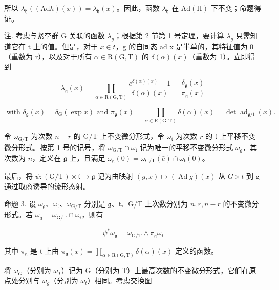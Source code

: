 所以 \(\lambda_{\mathfrak{h}}((\mathrm{Ad}h)(x)) = \lambda_{\mathfrak{h}}(x)\)。因此，函数 \(\lambda_{\mathfrak{h}}\) 在 \(\mathrm{Ad(H)}\) 下不变；命题得证。

注. 考虑与紧李群 G 关联的函数 \(\lambda_{g}\)；根据第 2 节第 1 号定理，要计算 \(\lambda_{g}\) 只需知道它在 t 上的值。但是，对于 \(x \in t\)，g 的自同态 ad x 是半单的，其特征值为 0（重数为 r），以及对于所有 \(\alpha \in \mathrm{R}(\mathrm{G}, \mathrm{T})\) 的 \(\delta(\alpha)(x)\)（重数为 1）。立即得到

\[
\lambda_ {\mathfrak {g}} (x) = \prod_ {\alpha \in \mathrm{R} (\mathrm{G}, \mathrm{T})} \frac {e ^ {\delta (\alpha) (x)} - 1}{\delta (\alpha) (x)} = \frac {\delta_ {\mathfrak {g}} (x)}{\pi_ {\mathfrak {g}} (x)}\tag{11}
\]

\[
\text { with } \delta_ {\mathfrak {g}} (x) = \delta_ {\mathrm{G}} (\exp x) \text { and } \pi_ {\mathfrak {g}} (x) = \prod_ {\alpha \in \mathrm{R} (\mathrm{G}, \mathrm{T})} \delta (\alpha) (x) = \det \operatorname{ad} _ {\mathfrak {g} / \mathfrak {t}} (x).
\]

令 \(\omega_{\mathrm{G / T}}\) 为次数 \(n - r\) 的 \(\mathrm{G / T}\) 上不变微分形式，令 \(\omega_{\mathfrak{t}}\) 为次数 \(r\) 的 \(\mathfrak{t}\) 上平移不变微分形式。按第 1 号的记号，将 \(\omega_{\mathrm{G / T}} \cap \omega_{\mathfrak{t}}\) 记为唯一的平移不变微分形式 \(\omega_{\mathfrak{g}}\)，其次数为 \(n\)，定义在 \(\mathfrak{g}\) 上，且满足 \(\omega_{\mathfrak{g}}(0) = \omega_{\mathrm{G / T}}(\bar{e}) \cap \omega_{\mathfrak{t}}(0)\)。

最后，将 \(\psi:(\mathrm{G}/\mathrm{T})\times\mathfrak{t}\to\mathfrak{g}\) 记为由映射 \((g,x)\mapsto(\operatorname{Ad}g)(x)\) 从 \(G\times t\) 到 g 通过取商诱导的流形态射。

命题 3. 设 \(\omega_{\mathfrak{g}}\)、\(\omega_{\mathfrak{t}}\)、\(\omega_{\mathrm{G / T}}\) 分别是 \(\mathfrak{g}\)、\(\mathfrak{t}\)、\(\mathrm{G / T}\) 上次数分别为 \(n, r, n - r\) 的不变微分形式。若 \(\omega_{\mathfrak{g}} = \omega_{\mathrm{G / T}} \cap \omega_{\mathfrak{t}}\)，则有

\[
\psi^ {*} \omega_ {\mathfrak {g}} = \omega_ {\mathrm{G/T}} \wedge \pi_ {\mathfrak {g}} \omega_ {\mathfrak {t}}
\]

其中 \(\pi_{\mathfrak{g}}\) 是 \(\mathfrak{t}\) 上由 \(\pi_{\mathfrak{g}}(x) = \prod_{\alpha \in \mathrm{R}(\mathrm{G},\mathrm{T})}\delta (\alpha)(x)\) 定义的函数。

将 \(\omega_{G}\)（分别为 \(\omega_{T}\)）记为 G（分别为 T）上最高次数的不变微分形式，它们在原点处分别与 \(\omega_{g}\)（分别为 \(\omega_{t}\)）相同。考虑交换图

